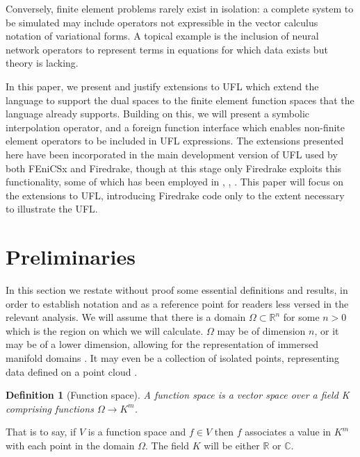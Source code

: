 \documentclass[a4paper,11pt]{article}
\newtheorem{definition}{Definition}[section]
\begin{document}
Conversely, finite element problems rarely exist in isolation: a complete system to be simulated may include operators  not expressible in the vector calculus notation of variational forms. A topical example is the inclusion of neural network operators to represent terms in equations for which data exists but theory is lacking. 

In this paper, we present and justify extensions to UFL which extend the language to support the dual spaces to the finite element function spaces that the language already supports. Building on this, we will present a symbolic interpolation operator, and a foreign function interface which enables non-finite element operators to be included in UFL expressions. The extensions presented here have been incorporated in the main development version of UFL used by both FEniCSx and Firedrake, though at this stage only Firedrake exploits this functionality, some of which has been employed in \textcite{bouziani_2021}, \textcite{bouziani_2023}, \textcite{nixon-hill_2024}. This paper will focus on the extensions to UFL, introducing Firedrake code only to the extent necessary to illustrate the UFL.

\section{Preliminaries}

In this section we restate without proof some essential definitions and results, in order to establish notation and as a reference point for readers less versed in the relevant analysis. We will assume that there is a domain $\Omega \subset \mathbb{R}^n$ for some $n>0$ which is the region on which we will calculate. $\Omega$ may be of dimension $n$, or it may be of a lower dimension, allowing for the representation of immersed manifold domains \parencite{rognes_2013}. It may even be a collection of isolated points, representing data defined on a point cloud \parencite{nixon-hill_2024}.

\begin{definition}[Function space]
    A \emph{function space} is a vector space over a field K comprising functions $\Omega\rightarrow K^m$.
\end{definition}
That is to say, if $V$ is a function space and $f\in V$ then $f$ associates a value in $K^m$ with each point in the domain $\Omega$. The field $K$ will be either $\mathbb{R}$ or $\mathbb{C}$.
\end{document}
